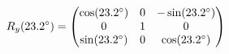 \documentclass[preview]{standalone}
\begin{document}
\begin{align*}
\special{dvisvgm:raw <g id='unique000'>}R_y(23.2^\circ) = \begin{pmatrix} \cos(23.2^\circ) & 0 & -\sin(23.2^\circ) \\ 0 & 1 & 0 \\ \sin(23.2^\circ) & 0 & \cos(23.2^\circ) \end{pmatrix}\special{dvisvgm:raw </g>}
\end{align*}
\end{document}
